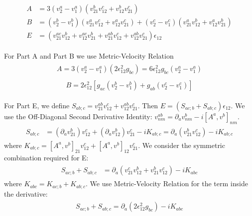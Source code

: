 \documentclass[twocolumn, prx, reprint, amsfonts, amsmath, amssymb, longbibliography, floatfix, aps]{revtex4-2}
\begin{document}
\begin{align}
\begin{aligned}
A &= 3 (v_2^a - v_1^a) (v_{21}^b v_{12}^c + v_{12}^b v_{21}^c) \\
B &= (v_2^b-v_1^b)(v_{21}^a v_{12}^c + v_{12}^a v_{21}^c) + (v_2^c-v_1^c)(v_{21}^a v_{12}^b + v_{12}^a v_{21}^b) \\
E &= (v_{21}^{ac}v_{12}^b + v_{12}^{ac}v_{21}^b + v_{21}^{ab}v_{12}^c + v_{12}^{ab}v_{21}^c)\epsilon_{12}
\end{aligned}
\end{align}

For Part A and Part B we use Metric-Velocity Relation
\begin{align}
\begin{aligned}
A = 3 (v_2^a - v_1^a) (2\epsilon_{12}^2 g_{bc}) = 6\epsilon_{12}^2 g_{bc} (v_2^a - v_1^a)
\label{A_Term0}
\end{aligned}
\end{align}
\begin{align}
\begin{aligned}
B = 2\epsilon_{12}^2 [ g_{ac}(v_2^b-v_1^b) + g_{ab}(v_2^c-v_1^c) ]
\label{B_Term0}
\end{aligned}
\end{align}

For Part E, we define $S_{ab;c} = v_{21}^{ab}v_{12}^c + v_{12}^{ab}v_{21}^c$. Then $E = (S_{ac;b} + S_{ab;c}) \epsilon_{12}$.
We use the Off-Diagonal Second Derivative Identity: $v_{nm}^{ab} = \partial_a v_{nm}^b - i [A^a, v^b]_{nm}$.
\begin{align}
\begin{aligned}
S_{ab;c} &= (\partial_a v_{21}^b) v_{12}^c + (\partial_a v_{12}^b) v_{21}^c - i K_{ab;c} = \partial_a(v_{21}^b v_{12}^c) - i K_{ab;c}
\end{aligned}
\end{align}
where $K_{ab;c} = [A^a, v^b]_{21} v_{12}^c + [A^a, v^b]_{12} v_{21}^c$.
We consider the symmetric combination required for E:
\begin{align}
\begin{aligned}
S_{ac;b} + S_{ab;c} &= \partial_a(v_{21}^c v_{12}^b + v_{21}^b v_{12}^c) - i K_{abc}
\end{aligned}
\end{align}
where $K_{abc} = K_{ac;b} + K_{ab;c}$. We use Metric-Velocity Relation for the term inside the derivative:
\begin{align}
\begin{aligned}
S_{ac;b} + S_{ab;c} = \partial_a (2 \epsilon_{12}^2 g_{bc}) - i K_{abc}
\end{aligned}
\end{align}
\end{document}
